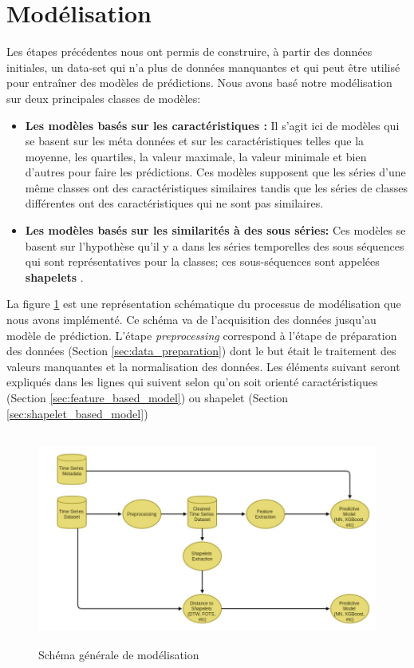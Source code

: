 \section{Modélisation}

Les étapes précédentes nous ont permis de construire, à partir des données initiales, un data-set qui n'a plus de données manquantes et qui peut être utilisé pour entraîner des modèles de prédictions. Nous avons basé notre modélisation sur deux principales classes de modèles:
\begin{itemize}
    \item \textbf{Les modèles basés sur les caractéristiques :} Il s'agit ici de modèles qui se basent sur les méta données et sur les caractéristiques telles que la moyenne, les quartiles, la valeur maximale, la valeur minimale et bien d'autres pour faire les prédictions. Ces modèles supposent que les séries d'une même classes ont des caractéristiques similaires tandis que les séries de classes différentes ont des caractéristiques qui ne sont pas similaires.
    \item \textbf{Les modèles basés sur les similarités à des sous séries:} Ces modèles se basent sur l'hypothèse qu'il y a dans les séries temporelles des sous séquences qui sont représentatives pour la classes; ces sous-séquences sont appelées \textbf{shapelets} \citep{ye2009time}.
\end{itemize}
La figure \ref{fig:modeling_shema} est une représentation schématique du processus de modélisation que nous avons implémenté. Ce schéma va de l'acquisition des données jusqu'au modèle de prédiction. L'étape \textit{preprocessing} correspond à l'étape de préparation des données (Section \ref{sec:data_preparation}) dont le but était le traitement des valeurs manquantes et la normalisation des données. Les éléments suivant seront expliqués dans les lignes qui suivent selon qu'on soit orienté caractéristiques (Section \ref{sec:feature_based_model}) ou shapelet (Section \ref{sec:shapelet_based_model})

\begin{figure}[!h]
    \centering
    \includegraphics[width=12cm,height=7cm]{report/figures/modeling-schema.jpg}
    \caption{Schéma générale de modélisation}
    \label{fig:modeling_shema}
\end{figure}

